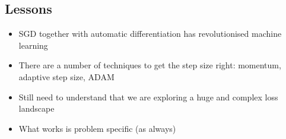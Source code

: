 
\begin{slide}
\section{Lessons}

\begin{PauseHighLight}
  \begin{itemize}
  \item SGD together with automatic differentiation has revolutionised
    machine learning\pause
  \item There are a number of techniques to get the step size
    right\pause: momentum\pauseb, adaptive step size\pauseb,
    ADAM\pauseb
  \item Still need to understand that we are exploring a huge and
    complex loss landscape\pause
  \item What works is problem specific\pause{} (as always)\pauseb
  \end{itemize}
\end{PauseHighLight}

\end{slide}

